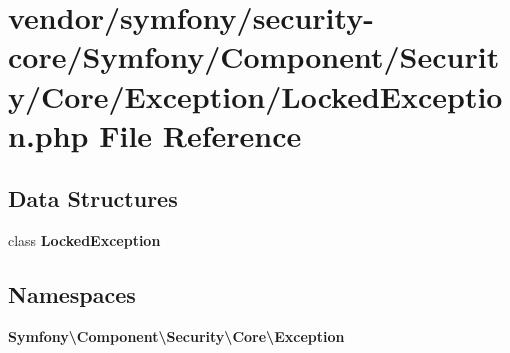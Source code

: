 \section{vendor/symfony/security-\/core/\+Symfony/\+Component/\+Security/\+Core/\+Exception/\+Locked\+Exception.php File Reference}
\label{_locked_exception_8php}
\subsection*{Data Structures}
\begin{DoxyCompactItemize}
\item 
class {\bf Locked\+Exception}
\end{DoxyCompactItemize}
\subsection*{Namespaces}
\begin{DoxyCompactItemize}
\item 
 {\bf Symfony\textbackslash{}\+Component\textbackslash{}\+Security\textbackslash{}\+Core\textbackslash{}\+Exception}
\end{DoxyCompactItemize}
